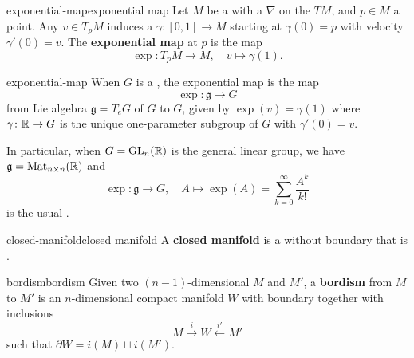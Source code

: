 \begin{topic}{exponential-map}{exponential map}
    Let $M$ be a  with a  $\nabla$ on the  $TM$, and $p \in M$ a point. Any  $v \in T_p M$ induces a  $\gamma \colon [0, 1] \to M$ starting at $\gamma(0) = p$ with velocity $\gamma'(0) = v$. The \textbf{exponential map} at $p$ is the map
    \[ \exp \colon T_p M \to M, \quad v \mapsto \gamma(1) . \]
\end{topic}

\begin{example}{exponential-map}
    When $G$ is a , the exponential map is the map
    \[ \exp \colon \mathfrak{g} \to G \]
    from Lie algebra $\mathfrak{g} = T_e G$ of $G$ to $G$, given by $\exp(v) = \gamma(1)$ where $\gamma \colon \mathbb{R} \to G$ is the unique one-parameter subgroup of $G$ with $\gamma'(0) = v$.
    
    In particular, when $G = \textup{GL}_n(\mathbb{R})$ is the general linear group, we have $\mathfrak{g} = \textup{Mat}_{n \times n}(\mathbb{R})$ and
    \[ \exp \colon \mathfrak{g} \to G, \quad A \mapsto \exp(A) = \sum_{k = 0}^{\infty} \frac{A^k}{k!} \]
    is the usual .
\end{example}

\begin{topic}{closed-manifold}{closed manifold}
    A \textbf{closed manifold} is a  without boundary that is .
\end{topic}

\begin{topic}{bordism}{bordism}
    Given two $(n - 1)$-dimensional   $M$ and $M'$, a \textbf{bordism} from $M$ to $M'$ is an $n$-dimensional compact manifold $W$ with boundary together with inclusions
    \[ M \xrightarrow{i} W \xleftarrow{i'} M' \]
    such that $\partial W = i(M) \sqcup i(M')$.
\end{topic}

